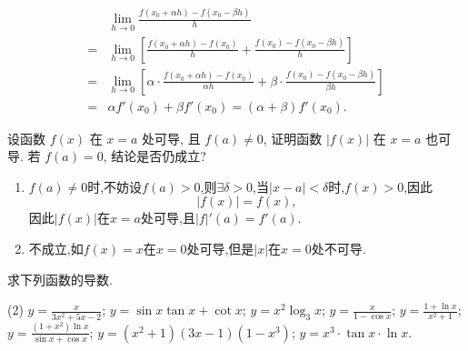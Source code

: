 \begin{solution}
    \begin{align*}
          & \lim_{h \to 0} \frac{f(x_0+\alpha h) - f(x_0-\beta h)}{h}                                                                                  \\
        = & \lim_{h \to 0} \left[ \frac{f(x_0+\alpha h) - f(x_0)}{h} + \frac{f(x_0) - f(x_0-\beta h)}{h} \right]                                       \\
        = & \lim_{h \to 0} \left[ \alpha \cdot \frac{f(x_0+\alpha h) - f(x_0)}{\alpha h} + \beta \cdot \frac{f(x_0) - f(x_0-\beta h)}{\beta h} \right] \\
        = & \alpha f'(x_0) + \beta f'(x_0) = (\alpha+\beta)f'(x_0).
    \end{align*}
\end{solution}

\begin{exercise}[3.1.5]
    设函数 $f(x)$ 在 $x=a$ 处可导, 且 $f(a) \ne 0$, 证明函数 $|f(x)|$ 在 $x=a$ 也可导. 若 $f(a)=0$, 结论是否仍成立?
\end{exercise}

\begin{solution}
    \begin{enumerate}
        \item $f(a) \neq 0$时,不妨设$f(a) > 0$,则$\exists \delta > 0$,当$|x-a| < \delta$时,$f(x) > 0$,因此
              $$|f(x)| = f(x),$$
              因此$|f(x)|$在$x=a$处可导,且$|f|'(a) = f'(a)$.
        \item 不成立,如$f(x) = x$在$x=0$处可导,但是$|x|$在$x=0$处不可导.
    \end{enumerate}
\end{solution}

\begin{exercise}[3.1.6]
    求下列函数的导数.
    \begin{tasks}[label=(\arabic*)](2)
        \task $y = \frac{x}{3x^2+5x-2}$;
        \task $y = \sin x \tan x + \cot x$;
        \task $y = x^2 \log_3 x$;
        \task $y = \frac{x}{1-\cos x}$;
        \task $y = \frac{1+\ln x}{x^2+1}$;
        \task $y = \frac{(1+x^2)\ln x}{\sin x + \cos x}$;
        \task $y = (x^2+1)(3x-1)(1-x^3)$;
        \task $y = x^3 \cdot \tan x \cdot \ln x$.
    \end{tasks}
\end{exercise}

